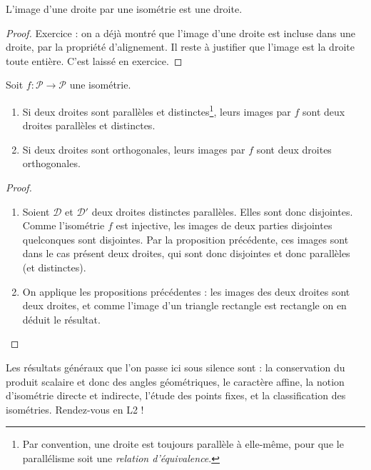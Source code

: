 \begin{proposition}
L'image d'une droite par une isométrie est une droite.
\end{proposition}
\begin{proof}
Exercice : on a déjà montré que l'image d'une droite est incluse dans une droite, par la propriété d'alignement. Il reste à justifier que l'image est la droite toute entière. C'est laissé en exercice.
\end{proof}

\begin{proposition}
Soit $f : \mathcal P\to \mathcal P$ une isométrie.
\begin{enumerate}
\item Si deux droites sont parallèles et distinctes\footnote{Par convention, une droite est toujours parallèle à elle-même, pour que le parallélisme soit une \emph{relation d'équivalence}.}, leurs images par $f$ sont deux droites parallèles et distinctes.
\item Si deux droites sont orthogonales, leurs images par $f$ sont deux droites orthogonales.
\end{enumerate}
\end{proposition}
\begin{proof}
\begin{enumerate}
\item Soient $\mathcal D$ et $\mathcal D'$ deux droites distinctes parallèles. Elles sont donc disjointes. Comme l'isométrie $f$ est injective, les images de deux parties disjointes quelconques sont disjointes. Par la proposition précédente, ces images sont dans le cas présent deux droites, qui sont donc disjointes et donc parallèles (et distinctes).
\item On applique les propositions précédentes : les images des deux droites sont deux droites, et comme l'image d'un triangle rectangle est rectangle on en déduit le résultat.
\end{enumerate}
\end{proof}

\begin{mdframed}
Les résultats généraux que l'on passe ici sous silence sont  : la conservation du produit scalaire et donc des angles géométriques, le caractère affine, la notion d'isométrie directe et indirecte, l'étude des points fixes, et la classification des isométries. Rendez-vous en L2 !
\end{mdframed}










